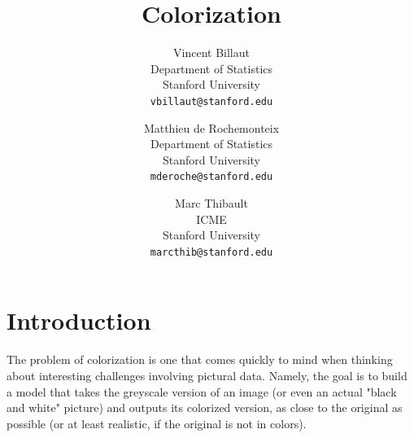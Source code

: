 \documentclass[10pt,twocolumn,letterpaper]{article}
\begin{document}
\title{Colorization}

\author{Vincent Billaut\\
Department of Statistics\\
Stanford University\\
{\tt\small vbillaut@stanford.edu}
\and
Matthieu de Rochemonteix\\
Department of Statistics\\
Stanford University\\
{\tt\small mderoche@stanford.edu}
\and
Marc Thibault\\
ICME\\
Stanford University\\
{\tt\small marcthib@stanford.edu}
}

\maketitle




\section{Introduction}

The problem of colorization is one that comes quickly to mind when thinking about interesting challenges involving pictural data. Namely, the goal is to build a model that takes the greyscale version of an image (or even an actual "black and white" picture) and outputs its colorized version, as close to the original as possible (or at least realistic, if the original is not in colors).
\end{document}
